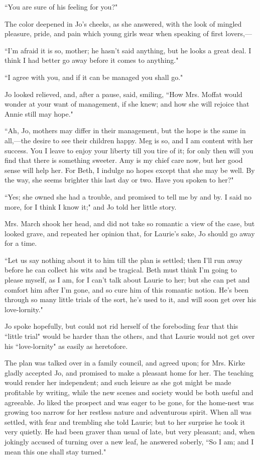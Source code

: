 ``You are sure of his feeling for you?"

The color deepened in Jo's cheeks, as she answered, with
the look of mingled pleasure, pride, and pain which young girls wear
when speaking of first lovers,---

``I'm afraid it is so, mother; he hasn't
said anything, but he looks a great deal. I think I had better go away
before it comes to anything."

``I agree with you, and if it can be managed you shall go."

Jo looked relieved, and, after a pause, said, smiling, ``How Mrs. Moffat
would wonder at your want of management, if she knew; and how she will
rejoice that Annie still may hope."

``Ah, Jo, mothers may differ in their management, but the hope is the
same in all,---the desire to see their children happy. Meg is so, and I
am content with her success. You I leave to enjoy your liberty till you
tire of it; for only then will you find that there is something sweeter.
Amy is my chief care now, but her good sense will help her. For Beth, I
indulge no hopes except that she may be well. By the way, she seems
brighter this last day or two. Have you spoken to her?"

``Yes; she owned she had a trouble, and promised to tell me by and by. I
said no more, for I think I know it;" and Jo told her little story.

Mrs. March shook her head, and did not take so romantic a view of the
case, but looked grave, and repeated her opinion that, for
Laurie's sake, Jo should go away for a time.

``Let us say nothing about it to him till the plan is settled; then
I'll run away before he can collect his wits and be
tragical. Beth must think I'm going to please myself, as
I am, for I can't talk about Laurie to her; but she can
pet and comfort him after I'm gone, and so cure him of
this romantic notion. He's been through so many little
trials of the sort, he's used to it, and will soon get
over his love-lornity."

Jo spoke hopefully, but could not rid herself of the foreboding fear
that this ``little trial" would be harder than the others, and that
Laurie would not get over his ``love-lornity" as easily as heretofore.

The plan was talked over in a family council, and agreed upon; for Mrs.
Kirke gladly accepted Jo, and promised to make a pleasant home for her.
The teaching would render her independent; and such leisure as she got
might be made profitable by writing, while the new scenes and society
would be both useful and agreeable. Jo liked the prospect and was eager
to be gone, for the home-nest was growing too narrow for her restless
nature and adventurous spirit. When all was settled, with fear and
trembling she told Laurie; but to her surprise he took it very quietly.
He had been graver than usual of late, but very pleasant; and, when
jokingly accused of turning over a new leaf, he answered soberly, ``So I
am; and I mean this one shall stay turned."

